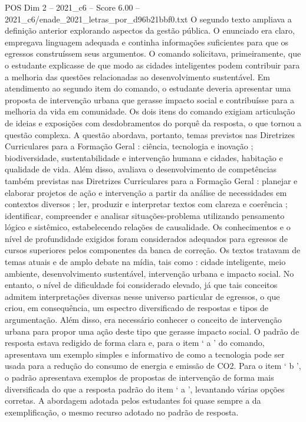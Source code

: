 \begin{textsample}{POS Dim 2 – 2021\_c6 – Score 6.00 – 2021\_c6/enade\_2021\_letras\_por\_d96b21bbf0.txt}
O segundo texto ampliava a definição anterior explorando aspectos da gestão pública.
O enunciado era claro, empregava linguagem adequada e continha informações suficientes para que os egressos construíssem seus argumentos.
O comando solicitava, primeiramente, que o estudante explicasse de que modo as cidades inteligentes podem contribuir para a melhoria das questões relacionadas ao desenvolvimento sustentável.
Em atendimento ao segundo item do comando, o estudante deveria apresentar uma proposta de intervenção urbana que gerasse impacto social e contribuísse para a melhoria da vida em comunidade.
Os dois itens do comando exigiam articulação de ideias e exposições com desdobramentos do porquê da resposta, o que tornou a questão complexa.
A questão abordava, portanto, temas previstos nas Diretrizes Curriculares para a Formação Geral : ciência, tecnologia e inovação ; biodiversidade, sustentabilidade e intervenção humana e cidades, habitação e qualidade de vida.
Além disso, avaliava o desenvolvimento de competências também previstas nas Diretrizes Curriculares para a Formação Geral : planejar e elaborar projetos de ação e intervenção a partir da análise de necessidades em contextos diversos ; ler, produzir e interpretar textos com clareza e coerência ; identificar, compreender e analisar situações-problema utilizando pensamento lógico e sistêmico, estabelecendo relações de causalidade.
Os conhecimentos e o nível de profundidade exigidos foram considerados adequados para egressos de cursos superiores pelos componentes da banca de correção.
Os textos tratavam de temas atuais e de amplo debate na mídia, tais como : cidade inteligente, meio ambiente, desenvolvimento sustentável, intervenção urbana e impacto social.
No entanto, o nível de dificuldade foi considerado elevado, já que tais conceitos admitem interpretações diversas nesse universo particular de egressos, o que criou, em consequência, um espectro diversificado de respostas e tipos de argumentação.
Além disso, era necessário conhecer o conceito de intervenção urbana para propor uma ação deste tipo que gerasse impacto social.
O padrão de resposta estava redigido de forma clara e, para o item ‘ a ’ do comando, apresentava um exemplo simples e informativo de como a tecnologia pode ser usada para a redução do consumo de energia e emissão de CO2.
Para o item ‘ b ’, o padrão apresentava exemplos de propostas de intervenção de forma mais diversificada do que a resposta padrão do item ‘ a ’, levantando várias opções corretas.
A abordagem adotada pelos estudantes foi quase sempre a da exemplificação, o mesmo recurso adotado no padrão de resposta.

\end{textsample}
